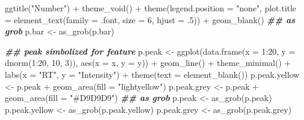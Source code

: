 \documentclass[
]{article}
\newenvironment{Shaded}{\begin{snugshade}}{\end{snugshade}}
\newcommand{\AttributeTok}[1]{\textcolor[rgb]{0.77,0.63,0.00}{#1}}
\newcommand{\DecValTok}[1]{\textcolor[rgb]{0.00,0.00,0.81}{#1}}
\newcommand{\DocumentationTok}[1]{\textcolor[rgb]{0.56,0.35,0.01}{\textbf{\textit{#1}}}}
\newcommand{\FunctionTok}[1]{\textcolor[rgb]{0.00,0.00,0.00}{#1}}
\newcommand{\NormalTok}[1]{#1}
\newcommand{\OtherTok}[1]{\textcolor[rgb]{0.56,0.35,0.01}{#1}}
\newcommand{\SpecialCharTok}[1]{\textcolor[rgb]{0.00,0.00,0.00}{#1}}
\newcommand{\StringTok}[1]{\textcolor[rgb]{0.31,0.60,0.02}{#1}}
\begin{document}
\begin{Shaded}
\begin{Highlighting}[]
  \FunctionTok{ggtitle}\NormalTok{(}\StringTok{"Number"}\NormalTok{) }\SpecialCharTok{+}
  \FunctionTok{theme\_void}\NormalTok{() }\SpecialCharTok{+}
  \FunctionTok{theme}\NormalTok{(}\AttributeTok{legend.position =} \StringTok{"none"}\NormalTok{,}
    \AttributeTok{plot.title =} \FunctionTok{element\_text}\NormalTok{(}\AttributeTok{family =}\NormalTok{ .font, }\AttributeTok{size =} \DecValTok{6}\NormalTok{, }\AttributeTok{hjust =}\NormalTok{ .}\DecValTok{5}\NormalTok{)) }\SpecialCharTok{+}
  \FunctionTok{geom\_blank}\NormalTok{()}
\DocumentationTok{\#\# as grob}
\NormalTok{p.bar }\OtherTok{\textless{}{-}} \FunctionTok{as\_grob}\NormalTok{(p.bar)}

\DocumentationTok{\#\# peak simbolized for feature }
\NormalTok{p.peak }\OtherTok{\textless{}{-}} \FunctionTok{ggplot}\NormalTok{(}\FunctionTok{data.frame}\NormalTok{(}\AttributeTok{x =} \DecValTok{1}\SpecialCharTok{:}\DecValTok{20}\NormalTok{, }\AttributeTok{y =} \FunctionTok{dnorm}\NormalTok{(}\DecValTok{1}\SpecialCharTok{:}\DecValTok{20}\NormalTok{, }\DecValTok{10}\NormalTok{, }\DecValTok{3}\NormalTok{)), }\FunctionTok{aes}\NormalTok{(}\AttributeTok{x =}\NormalTok{ x, }\AttributeTok{y =}\NormalTok{ y)) }\SpecialCharTok{+}
  \FunctionTok{geom\_line}\NormalTok{() }\SpecialCharTok{+}
  \FunctionTok{theme\_minimal}\NormalTok{() }\SpecialCharTok{+}
  \FunctionTok{labs}\NormalTok{(}\AttributeTok{x =} \StringTok{"RT"}\NormalTok{, }\AttributeTok{y =} \StringTok{"Intensity"}\NormalTok{) }\SpecialCharTok{+}
  \FunctionTok{theme}\NormalTok{(}\AttributeTok{text =} \FunctionTok{element\_blank}\NormalTok{())}
\NormalTok{p.peak.yellow }\OtherTok{\textless{}{-}}\NormalTok{ p.peak }\SpecialCharTok{+} 
  \FunctionTok{geom\_area}\NormalTok{(}\AttributeTok{fill =} \StringTok{"lightyellow"}\NormalTok{) }
\NormalTok{p.peak.grey }\OtherTok{\textless{}{-}}\NormalTok{ p.peak }\SpecialCharTok{+}
  \FunctionTok{geom\_area}\NormalTok{(}\AttributeTok{fill =} \StringTok{"\#D9D9D9"}\NormalTok{) }
\DocumentationTok{\#\# as grob}
\NormalTok{p.peak }\OtherTok{\textless{}{-}} \FunctionTok{as\_grob}\NormalTok{(p.peak)}
\NormalTok{p.peak.yellow }\OtherTok{\textless{}{-}} \FunctionTok{as\_grob}\NormalTok{(p.peak.yellow)}
\NormalTok{p.peak.grey }\OtherTok{\textless{}{-}} \FunctionTok{as\_grob}\NormalTok{(p.peak.grey)}


\end{Highlighting}
\end{Shaded}
\end{document}
